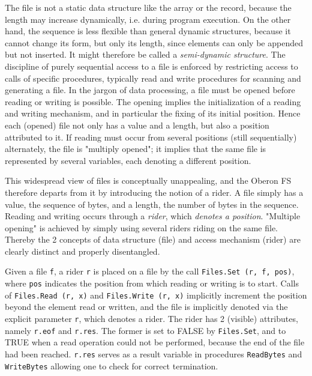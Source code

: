 The file is not a static data structure like the array or the record, because the length may increase
dynamically, i.e. during program execution. On the other hand, the sequence is less flexible than
general dynamic structures, because it cannot change its form, but only its length, since elements
can only be appended but not inserted. It might therefore be called a \emph{semi-dynamic structure}.
The discipline of purely sequential access to a file is enforced by restricting access to calls of
specific procedures, typically read and write procedures for scanning and generating a file. In the
jargon of data processing, a file must be opened before reading or writing is possible. The
opening implies the initialization of a reading and writing mechanism, and in particular the fixing of
its initial position. Hence each (opened) file not only has a value and a length, but also a position
attributed to it. If reading must occur from several positions (still sequentially) alternately, the
file is "multiply opened"; it implies that the same file is represented by several variables, each
denoting a different position.

This widespread view of files is conceptually unappealing, and the Oberon FS therefore departs from it
by introducing the notion of a rider. A file simply has a value, the sequence of bytes, and a length,
the number of bytes in the sequence. Reading and writing occurs through a \emph{rider}, which
\emph{denotes a position}. "Multiple opening" is achieved by simply using several riders riding on the
same file. Thereby the 2 concepts of data structure (file) and access mechanism (rider) are clearly
distinct and properly disentangled.

Given a file \verb|f|, a rider \verb|r| is placed on a file by the call \verb|Files.Set (r, f, pos)|,
where \verb|pos| indicates the position from which reading or writing is to start. Calls of
\verb|Files.Read (r, x)| and \verb|Files.Write (r, x)| implicitly increment the position beyond the
element read or written, and the file is implicitly denoted via the explicit parameter \verb|r|, which
denotes a rider. The rider has 2 (visible) attributes, namely \verb|r.eof| and \verb|r.res|. The former
is set to FALSE by \verb|Files.Set|, and to TRUE when a read operation could not be performed, because
the end of the file had been reached. \verb|r.res| serves as a result variable in procedures
\verb|ReadBytes| and \verb|WriteBytes| allowing one to check for correct termination.

